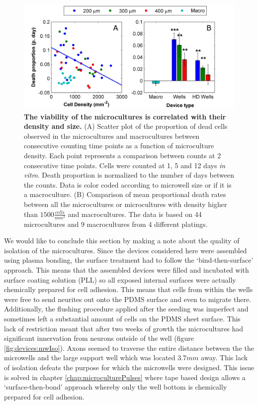         \begin{figure}[h]
            \centering
            \includegraphics[width=15cm]{chapter4/figures/microWellsStats/mwStats.jpg}
            \caption[Statistics of microculture viability over development]{\textbf{The viability of the microcultures is correlated with their density and size.} (A) Scatter plot of the proportion of dead cells observed in the microcultures and macrocultures between consecutive counting time points as a function of microculture density. Each point represents a comparison between counts at 2 consecutive time points. Cells were counted at 1, 5 and 12 days \textit{in vitro}. Death proportion is normalized to the number of days between the counts. Data is color coded according to microwell size or if it is a macroculture. (B) Comparison of mean proportional death rates between all the microcultures or microcultures with density higher than \(1500 \frac{cells}{mm^2}\) and macrocultures. The data is based on 44 microcultures and 9 macrocultures from 4 different platings.}
            \label{fig:devices:mwStats}
        \end{figure}

        We would like to conclude this section by making a note about the quality of isolation of the microcultures. Since the devices considered here were assembled using plasma bonding, the surface treatment had to follow the `bind-then-surface' approach. This means that the assembled devices were filled and incubated with surface coating solution (PLL) so all exposed internal surfaces were actually chemically prepared for cell adhesion. This means that cells from within the wells were free to send neurites out onto the PDMS surface and even to migrate there. Additionally, the flushing procedure applied after the seeding was imperfect and sometimes left a substantial amount of cells on the PDMS sheet surface. This lack of restriction meant that after two weeks of growth the microcultures had significant innervation from neurons outside of the well (figure \ref{fig:devices:mwIso}). Axons seemed to traverse the entire distance between the the microwells and the large support well which was located \(3.7 mm\) away. This lack of isolation defeats the purpose for which the microwells were designed. This issue is solved in chapter \ref{chap:microculturePulses} where tape based design allows a `surface-then-bond' approach whereby only the well bottom is chemically prepared for cell adhesion.


